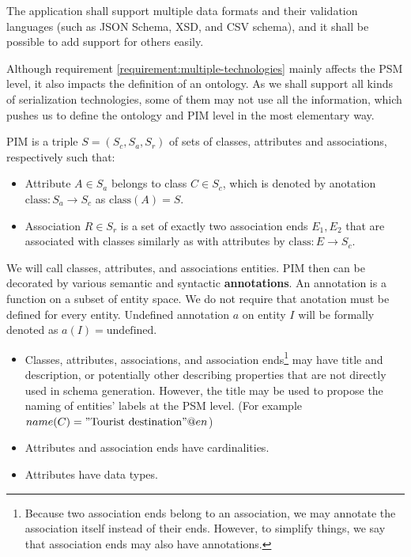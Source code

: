 \begin{requirement}
    \label{requirement:multiple-technologies}
    The application shall support multiple data formats and their validation languages (such as JSON Schema, XSD, and CSV schema), and it shall be possible to add support for others easily.
\end{requirement}

Although requirement \ref{requirement:multiple-technologies} mainly affects the PSM level, it also impacts the definition of an ontology. As we shall support all kinds of serialization technologies, some of them may not use all the information, which pushes us to define the ontology and PIM level in the most elementary way.

\begin{definition}[PIM] PIM is a triple $S=(S_c, S_a, S_r)$ of sets of classes, attributes and associations, respectively such that:
\begin{itemize}
    \item Attribute $A \in S_a$ belongs to class $C \in S_c$, which is denoted by anotation $\textrm{class}: S_a \rightarrow S_c$ as $\textrm{class}(A)=S$.
    \item Association $R \in S_r$ is a set of exactly two association ends ${E_1, E_2}$ that are associated with classes similarly as with attributes by $\textrm{class}: E \rightarrow S_c$.
\end{itemize}


We will call classes, attributes, and associations entities. PIM then can be decorated by various semantic and syntactic \textbf{annotations}. An annotation is a function on a subset of entity space. We do not require that anotation must be defined for every entity. Undefined annotation $a$ on entity $I$ will be formally denoted as $a(I) = \textrm{undefined}$.

\begin{itemize}
    \item Classes, attributes, associations, and association ends\footnote{Because two association ends belong to an association, we may annotate the association itself instead of their ends. However, to simplify things, we say that association ends may also have annotations.} may have title and description, or potentially other describing properties that are not directly used in schema generation. However, the title may be used to propose the naming of entities' labels at the PSM level. (For example $name(C)="\textrm{Tourist destination}"@en$)
    \item Attributes and association ends have cardinalities.
    \item Attributes have data types.
\end{itemize}

\end{definition}

